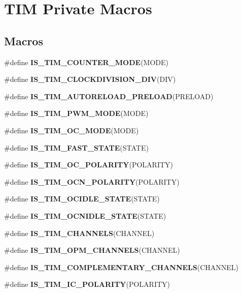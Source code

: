 \hypertarget{group___t_i_m___private___macros}{}\section{T\+IM Private Macros}
\label{group___t_i_m___private___macros}
\subsection*{Macros}
\begin{DoxyCompactItemize}
\item 
\#define {\bfseries I\+S\+\_\+\+T\+I\+M\+\_\+\+C\+O\+U\+N\+T\+E\+R\+\_\+\+M\+O\+DE}(M\+O\+DE)
\item 
\#define {\bfseries I\+S\+\_\+\+T\+I\+M\+\_\+\+C\+L\+O\+C\+K\+D\+I\+V\+I\+S\+I\+O\+N\+\_\+\+D\+IV}(D\+IV)
\item 
\#define {\bfseries I\+S\+\_\+\+T\+I\+M\+\_\+\+A\+U\+T\+O\+R\+E\+L\+O\+A\+D\+\_\+\+P\+R\+E\+L\+O\+AD}(P\+R\+E\+L\+O\+AD)
\item 
\#define {\bfseries I\+S\+\_\+\+T\+I\+M\+\_\+\+P\+W\+M\+\_\+\+M\+O\+DE}(M\+O\+DE)
\item 
\#define {\bfseries I\+S\+\_\+\+T\+I\+M\+\_\+\+O\+C\+\_\+\+M\+O\+DE}(M\+O\+DE)
\item 
\#define {\bfseries I\+S\+\_\+\+T\+I\+M\+\_\+\+F\+A\+S\+T\+\_\+\+S\+T\+A\+TE}(S\+T\+A\+TE)
\item 
\#define {\bfseries I\+S\+\_\+\+T\+I\+M\+\_\+\+O\+C\+\_\+\+P\+O\+L\+A\+R\+I\+TY}(P\+O\+L\+A\+R\+I\+TY)
\item 
\#define {\bfseries I\+S\+\_\+\+T\+I\+M\+\_\+\+O\+C\+N\+\_\+\+P\+O\+L\+A\+R\+I\+TY}(P\+O\+L\+A\+R\+I\+TY)
\item 
\#define {\bfseries I\+S\+\_\+\+T\+I\+M\+\_\+\+O\+C\+I\+D\+L\+E\+\_\+\+S\+T\+A\+TE}(S\+T\+A\+TE)
\item 
\#define {\bfseries I\+S\+\_\+\+T\+I\+M\+\_\+\+O\+C\+N\+I\+D\+L\+E\+\_\+\+S\+T\+A\+TE}(S\+T\+A\+TE)
\item 
\#define {\bfseries I\+S\+\_\+\+T\+I\+M\+\_\+\+C\+H\+A\+N\+N\+E\+LS}(C\+H\+A\+N\+N\+EL)
\item 
\#define {\bfseries I\+S\+\_\+\+T\+I\+M\+\_\+\+O\+P\+M\+\_\+\+C\+H\+A\+N\+N\+E\+LS}(C\+H\+A\+N\+N\+EL)
\item 
\#define {\bfseries I\+S\+\_\+\+T\+I\+M\+\_\+\+C\+O\+M\+P\+L\+E\+M\+E\+N\+T\+A\+R\+Y\+\_\+\+C\+H\+A\+N\+N\+E\+LS}(C\+H\+A\+N\+N\+EL)
\item 
\#define {\bfseries I\+S\+\_\+\+T\+I\+M\+\_\+\+I\+C\+\_\+\+P\+O\+L\+A\+R\+I\+TY}(P\+O\+L\+A\+R\+I\+TY)

\end{DoxyCompactItemize}
